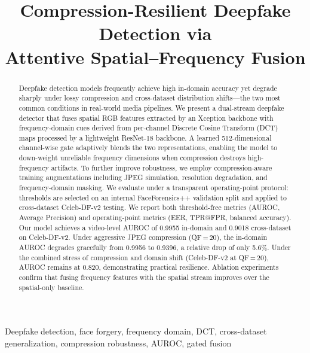 \documentclass[conference]{IEEEtran}
\title{Compression-Resilient Deepfake Detection via\\Attentive Spatial--Frequency Fusion}
\author{
\IEEEauthorblockN{Yash Aggarwal \hspace{1.2em} Yash Jain}
\IEEEauthorblockA{Department of Computer Science and Engineering\\
Delhi Technological University, Delhi, India\\
Email: \{yashaggarwal,yashjain\}@dtu.ac.in}
}
\begin{document}
\maketitle

\begin{abstract}
Deepfake detection models frequently achieve high in-domain accuracy yet degrade sharply under lossy compression and cross-dataset distribution shifts---the two most common conditions in real-world media pipelines.
We present a dual-stream deepfake detector that fuses spatial RGB features extracted by an Xception backbone with frequency-domain cues derived from per-channel Discrete Cosine Transform (DCT) maps processed by a lightweight ResNet-18 backbone.
A learned 512-dimensional channel-wise gate adaptively blends the two representations, enabling the model to down-weight unreliable frequency dimensions when compression destroys high-frequency artifacts.
To further improve robustness, we employ compression-aware training augmentations including JPEG simulation, resolution degradation, and frequency-domain masking.
We evaluate under a transparent operating-point protocol: thresholds are selected on an internal FaceForensics++ validation split and applied to cross-dataset Celeb-DF-v2 testing.
We report both threshold-free metrics (AUROC, Average Precision) and operating-point metrics (EER, TPR@FPR, balanced accuracy).
Our model achieves a video-level AUROC of 0.9955 in-domain and 0.9018 cross-dataset on Celeb-DF-v2.
Under aggressive JPEG compression (QF\,=\,20), the in-domain AUROC degrades gracefully from 0.9956 to 0.9396, a relative drop of only 5.6\%.
Under the combined stress of compression and domain shift (Celeb-DF-v2 at QF\,=\,20), AUROC remains at 0.820, demonstrating practical resilience.
Ablation experiments confirm that fusing frequency features with the spatial stream improves over the spatial-only baseline.
\end{abstract}

\begin{IEEEkeywords}
Deepfake detection, face forgery, frequency domain, DCT, cross-dataset generalization, compression robustness, AUROC, gated fusion
\end{IEEEkeywords}

\end{document}
